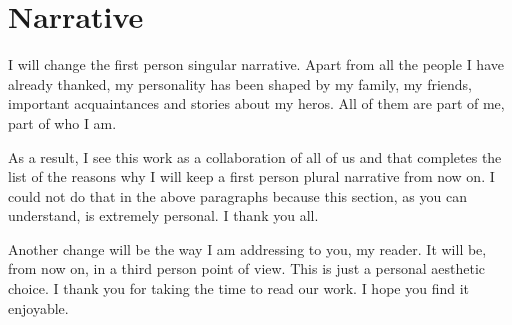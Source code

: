 \section{Narrative}
I will change the first person singular narrative. Apart from all the people I have already thanked, my personality has been shaped by my family, my friends, important acquaintances and stories about my heros. All of them are part of me, part of who I am.

As a result, I see this work as a collaboration of all of us and that completes the list of the reasons why I will keep a first person plural narrative from now on. I could not do that in the above paragraphs because this section, as you can understand, is extremely personal. I thank you all.

Another change will be the way I am addressing to you, my reader. It will be, from now on, in a third person point of view. This is just a personal aesthetic choice. I thank you for taking the time to read our work. I hope you find it enjoyable.
